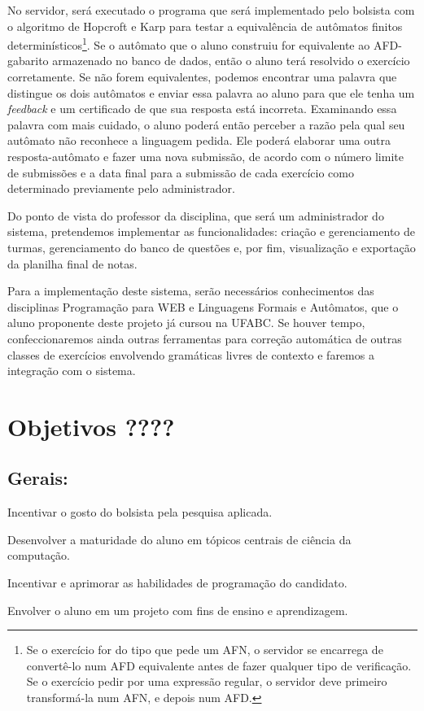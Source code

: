 \documentclass[
	12pt,				%
	openany,
	oneside,
	a4paper,			%
	english,			%
	brazil,				%
	]{abntex2}
\begin{document}
No servidor, será executado o programa que será implementado pelo bolsista com o algoritmo de Hopcroft e Karp para testar a equivalência de autômatos finitos determinísticos\footnote{Se o exercício for do   tipo que pede um AFN, o servidor se encarrega de convertê-lo num AFD   equivalente antes de fazer qualquer tipo de verificação. Se o   exercício pedir por uma expressão regular, o servidor deve primeiro   transformá-la num AFN, e depois num AFD.}. Se o autômato que o aluno construiu for equivalente ao AFD-gabarito armazenado no banco de dados, então o aluno terá resolvido o exercício corretamente. Se não forem equivalentes, podemos encontrar uma palavra que distingue os dois autômatos e enviar essa palavra ao aluno para que ele tenha um \emph{feedback} e um certificado de que sua resposta está incorreta. Examinando essa palavra com mais cuidado, o aluno poderá então perceber a razão pela qual seu autômato não reconhece a linguagem pedida. Ele poderá elaborar uma outra resposta-autômato e fazer uma nova submissão, de acordo com o número limite de submissões e a data final para a submissão de cada exercício como determinado previamente pelo administrador.

Do ponto de vista do professor da disciplina, que será um administrador do sistema, pretendemos implementar as funcionalidades: criação e gerenciamento de turmas, gerenciamento do banco de questões e, por fim, visualização e exportação da planilha final de notas. 

 Para a implementação deste sistema, serão necessários conhecimentos das disciplinas Programação para WEB e Linguagens Formais e Autômatos, que o aluno proponente deste projeto já cursou na UFABC. Se houver tempo, confeccionaremos ainda outras ferramentas para correção automática de outras classes de exercícios envolvendo gramáticas livres de contexto e faremos a integração com o sistema. 



\chapter {Objetivos ????}

\section {Gerais:}
\begin{alineas}
	\item Incentivar o gosto do bolsista pela pesquisa aplicada.
	\item Desenvolver a maturidade do aluno em tópicos centrais de ciência da computação.
	\item Incentivar e aprimorar as habilidades de programação do candidato.
	\item Envolver o aluno em um projeto com fins de ensino e aprendizagem.
\end{alineas}
\end{document}
